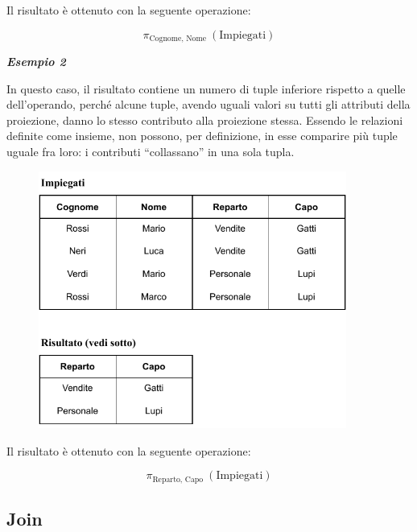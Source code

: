 \documentclass[a4paper]{article}
\newcommand{\dquotes}[1]{``#1''}
\begin{document}
	\noindent
	Il risultato è ottenuto con la seguente operazione:
	
	\begin{equation*}
		\pi_{\text{Cognome, Nome }}\left(\text{Impiegati}\right)
	\end{equation*}

	\newpage
	
	\noindent
	\textcolor{Green4}{\textbf{\emph{Esempio 2}}}\newline
	
	\noindent
	In questo caso, il risultato contiene un numero di tuple inferiore rispetto a quelle dell'operando, perché alcune tuple, avendo uguali valori su tutti gli attributi della proiezione, danno lo stesso contributo alla proiezione stessa. Essendo le relazioni definite come insieme, non possono, per definizione, in esse comparire più tuple uguale fra loro: i contributi \dquotes{collassano} in una sola tupla.
	
	\begin{figure}[!htp]
		\centering
		\includegraphics[width=0.9\textwidth]{img/proiezione2.pdf}
	\end{figure}
	
	\noindent
	Il risultato è ottenuto con la seguente operazione:
	
	\begin{equation*}
		\pi_{\text{Reparto, Capo }}\left(\text{Impiegati}\right)
	\end{equation*}
	
	\newpage
	
	\subsection{Join}
	
\end{document}

